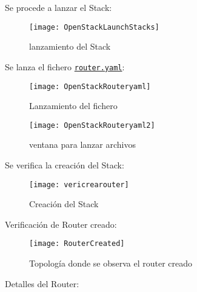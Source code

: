 \documentclass[10pt]{article}   			%
\begin{document}
\begin{enumerate}
Se procede a lanzar el Stack:\\


\begin{figure}[ht] %
	\centering
	\texttt{[image: OpenStackLaunchStacks]}   %
	\caption{lanzamiento del Stack} \label{fig:Elementos}
\end{figure}

Se lanza el fichero \texttt{\href{https://github.com/wilrilo/talleres/blob/master/file/taller1/router.yaml}{router.yaml}}:\\


\begin{figure}[ht] %
	\centering
	\texttt{[image: OpenStackRouteryaml]}   %
	\caption{Lanzamiento del fichero} \label{fig:Elementos}
\end{figure}

\begin{figure}[ht] %
	\centering
	\texttt{[image: OpenStackRouteryaml2]}   %
	\caption{ventana para lanzar archivos}
	 \label{fig:Elementos}
\end{figure}

\newpage

Se verifica la creación del Stack: \\



\begin{figure}[ht] %
	\centering
	\texttt{[image: vericrearouter]}   %
	\caption{Creación del  Stack} \label{fig:Elementos}
\end{figure}

Verificación de Router creado:\\


\begin{figure}[ht] %
	\centering
	\texttt{[image: RouterCreated]}   %
	\caption{Topología donde se observa el router creado} \label{fig:Elementos}
\end{figure}
\newpage
Detalles del Router:


\end{enumerate}
\end{document}
